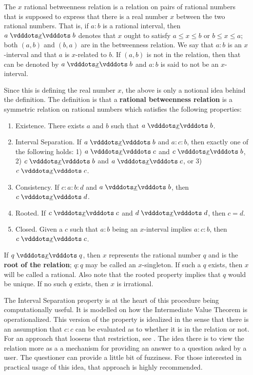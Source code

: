 \documentclass[12pt]{article}
\begin{document}
The $x$ rational betweenness relation is a relation on pairs of rational numbers that is supposed to express that there is a real number $x$ between the two rational numbers. That is, if $a : b$ is a rational interval, then $a \xrel b$ denotes that $x$ ought to satisfy $a \leq x \leq b$ or $b \leq x \leq a$;  both $(a,b)$ and $(b,a)$ are in the betweenness relation. We say that $a:b$ is an $x$-interval and that $a$ is $x$-related to $b$. If $(a,b)$ is not in the relation, then that can be denoted by \sout{$a \xrel b$} and $a:b$ is said to not be an $x$-interval. 

Since this is defining the real number $x$, the above is only a notional idea behind the definition. The definition is that a \textbf{rational betweenness relation} is a symmetric relation on rational numbers 
which satisfies the following properties:
\begin{enumerate}
    \item Existence. There exists $a$ and $b$ such that $a\xrel b$.
    \item Interval Separation. If $a \xrel b$ and $a : c : b$, then exactly one of the following holds: 1) $a \xrel c$ and \sout{$c \xrel b$}, 2) $c \xrel b$ and \sout{$a \xrel c$}, or 3) $c \xrel c$. 
    \item Consistency. If $c : a : b : d$ and $a \xrel b$, then $c \xrel d$. 
    \item Rooted. If $c \xrel c$ and $d \xrel d$, then $c=d$. 
    \item Closed. Given a $c$ such that $a:b$ being an $x$-interval implies $a:c:b$, then $c \xrel c$. 
\end{enumerate}

If $q \xrel q$, then $x$ represents the rational number $q$ and is the \textbf{root of the relation}; $q:q$ may be called an $x$-singleton. If such a $q$ exists, then $x$ will be called a rational. Also note that the rooted property implies that $q$ would be unique. If no such $q$ exists, then $x$ is irrational. 

The Interval Separation property is at the heart of this procedure being computationally useful. It is modelled on how the Intermediate Value Theorem is operationalized. This version of the property is idealized in the sense that there is an assumption that $c:c$ can be evaluated as to whether it is in the relation or not. For an approach that loosens that restriction, see \cite{taylor23main}. The idea there is to view the relation more as a a mechanism for providing an answer to a question asked by a user. The questioner can provide a little bit of fuzziness. For those interested in practical usage of this idea, that approach is highly recommended. 
\end{document}
